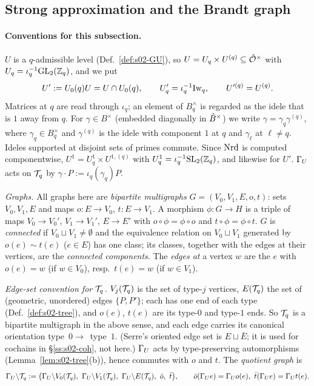\subsection{Strong approximation and the Brandt graph}\label{ss:s02-quotient}

\paragraph{Conventions for this subsection.} $U$ is a $q$-admissible level (Def.~\ref{def:s02-GU}), so
$U=U_q\times U^{(q)}\subseteq\hat{\mathcal{O}}^\times$ with $U_q=\iota_q^{-1}\mathrm{GL}_2(\mathbb{Z}_q)$, and we put
\[U':=U_0(q)U=U\cap U_0(q),\qquad U'_q=\iota_q^{-1}\mathrm{Iw}_q,\qquad U'^{(q)}=U^{(q)}.\]
Matrices at $q$ are read through $\iota_q$; an element of $B_q^\times$ is regarded as the idele that is $1$ away from $q$.
For $\gamma\in B^\times$ (embedded diagonally in $\hat{B}^\times$) we write $\gamma=\gamma_q\gamma^{(q)}$, where $\gamma_q\in B_q^\times$
and $\gamma^{(q)}$ is the idele with component $1$ at $q$ and $\gamma_\ell$ at $\ell\ne q$. Ideles supported at disjoint sets of
primes commute. Since $\mathrm{Nrd}$ is computed componentwise, $U^1=U^1_q\times U^{1,(q)}$ with $U^1_q=\iota_q^{-1}\mathrm{SL}_2(\mathbb{Z}_q)$, and
likewise for $U'$. $\Gamma_U$ acts on $\mathcal{T}_q$ by $\gamma\cdot P:=\iota_q(\gamma_q)P$.

\emph{Graphs.} All graphs here are \emph{bipartite multigraphs} $G=(V_0,V_1,E,o,t)$: sets $V_0,V_1,E$ and maps
$o:E\to V_0$, $t:E\to V_1$. A morphism $\phi:G\to H$ is a triple of maps $V_0\to V_0'$, $V_1\to V_1'$, $E\to E'$ with
$o\circ\phi=\phi\circ o$ and $t\circ\phi=\phi\circ t$. $G$ is \emph{connected} if $V_0\sqcup V_1\ne\emptyset$ and the
equivalence relation on $V_0\sqcup V_1$ generated by $o(e)\sim t(e)$ ($e\in E$) has one class; its classes, together with the
edges at their vertices, are the \emph{connected components}. The \emph{edges at} a vertex $w$ are the $e$ with $o(e)=w$
(if $w\in V_0$), resp.\ $t(e)=w$ (if $w\in V_1$).

\emph{Edge-set convention for $\mathcal{T}_q$.} $V_j(\mathcal{T}_q)$ is the set of type-$j$ vertices, $E(\mathcal{T}_q)$ the set of (geometric,
unordered) edges $\{P,P'\}$; each has one end of each type (Def.~\ref{def:s02-tree}), and $o(e)$, $t(e)$ are its type-$0$
and type-$1$ ends. So $\mathcal{T}_q$ is a bipartite multigraph in the above sense, and each edge carries its canonical orientation
type~$0\to$~type~$1$. (Serre's oriented edge set is $E\sqcup\bar E$; it is used for cochains in \S\ref{ss:s02-coh}, not here.)
$\Gamma_U$ acts by type-preserving automorphisms (Lemma~\ref{lem:s02-tree}(b)), hence commutes with $o$ and $t$. The
\emph{quotient graph} is
\[\Gamma_U\backslash\mathcal{T}_q:=\big(\Gamma_U\backslash V_0(\mathcal{T}_q),\ \Gamma_U\backslash V_1(\mathcal{T}_q),\ \Gamma_U\backslash E(\mathcal{T}_q),\ \bar o,\ \bar t\big),
\qquad \bar o(\Gamma_U e)=\Gamma_U o(e),\ \bar t(\Gamma_U e)=\Gamma_U t(e).\]

